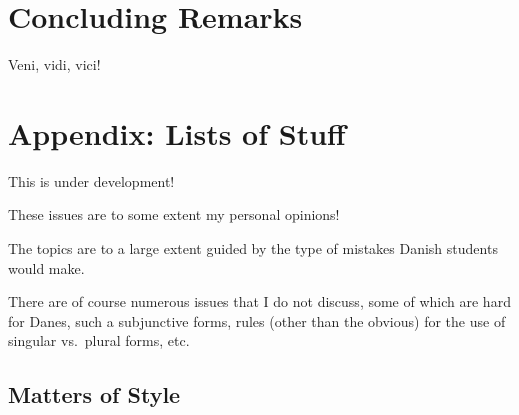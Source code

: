 \documentclass[a4paper,12pt]{report}
\begin{document}
\chapter{Concluding Remarks}
Veni, vidi, vici!





\appendix

\newpage

\chapter*{Appendix: Lists of Stuff}
\label{appendix}

This is under development!

These issues are to some extent my personal opinions!

The topics are to a large extent guided by the type of mistakes Danish
students would make.

There are of course numerous issues that I do not discuss, some of
which are hard for Danes, such a subjunctive forms, rules (other
than the obvious) for the use of singular vs.\ plural forms, etc.

\section*{Matters of Style}
\end{document}
